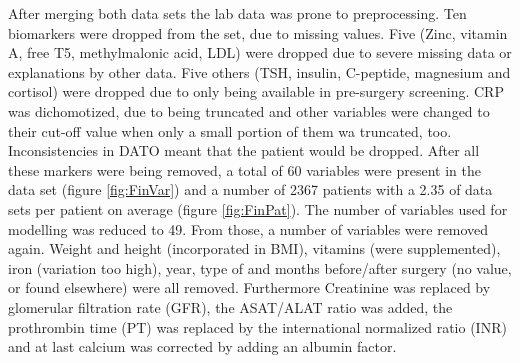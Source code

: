 \documentclass[10pt,a4paper]{report}
\begin{document}
	After merging both data sets the lab data was prone to preprocessing. Ten biomarkers were dropped from the set, due to missing values. Five (Zinc, vitamin A, free T5, methylmalonic acid, LDL) were dropped due to severe missing data or explanations by other data. Five others (TSH, insulin, C-peptide, magnesium and cortisol) were dropped due to only being available in pre-surgery screening. CRP was dichomotized, due to being truncated and other variables were changed to their cut-off value when only a small portion of them wa truncated, too. Inconsistencies in DATO meant that the patient would be dropped. After all these markers were being removed, a total of 60 variables were present in the data set (figure \ref{fig:FinVar}) and a number of 2367 patients with a 2.35 of data sets per patient on average (figure \ref{fig:FinPat}). The number of variables used for modelling was reduced to 49. From those, a number of variables were removed again. Weight and height (incorporated in BMI), vitamins (were supplemented), iron (variation too high), year, type of and months before/after surgery (no value, or found elsewhere) were all removed. Furthermore Creatinine was replaced by glomerular filtration rate (GFR), the ASAT/ALAT ratio was added, the prothrombin time (PT) was replaced by the international normalized ratio (INR) and at last calcium was corrected by adding an albumin factor. 
	
\end{document}
